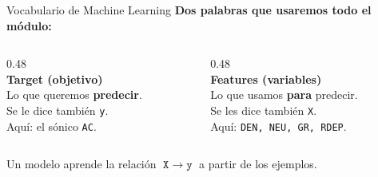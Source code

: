 \documentclass[aspectratio=169, 11pt]{beamer}
\begin{document}
\begin{frame}{Vocabulario de Machine Learning}
  \vspace{-6pt}
  {\small\color{arcaDark}\bfseries
    Dos palabras que usaremos todo el módulo:}

  \vspace{10pt}
  \begin{columns}[T]
    \begin{column}{0.48\textwidth}
      \centering
      {\Large\color{arcaRed}\faBullseye}\\[6pt]
      {\normalsize\bfseries\color{arcaDark} Target (objetivo)}\\[4pt]
      {\footnotesize\color{textMuted} Lo que queremos \textbf{predecir}.\\
      Se le dice también \texttt{y}.\\[4pt]
      Aquí: el sónico \texttt{AC}.}
    \end{column}
    \begin{column}{0.48\textwidth}
      \centering
      {\Large\color{arcaRed}\faSlidersH}\\[6pt]
      {\normalsize\bfseries\color{arcaDark} Features (variables)}\\[4pt]
      {\footnotesize\color{textMuted} Lo que usamos \textbf{para} predecir.\\
      Se les dice también \texttt{X}.\\[4pt]
      Aquí: \texttt{DEN, NEU, GR, RDEP}.}
    \end{column}
  \end{columns}

  \vspace{12pt}
  \centering
  {\footnotesize\color{arcaDark}
    Un modelo aprende la relación \quad
    \(\texttt{X} \;\longrightarrow\; \texttt{y}\) \quad
    a partir de los ejemplos.}
\end{frame}
\end{document}
